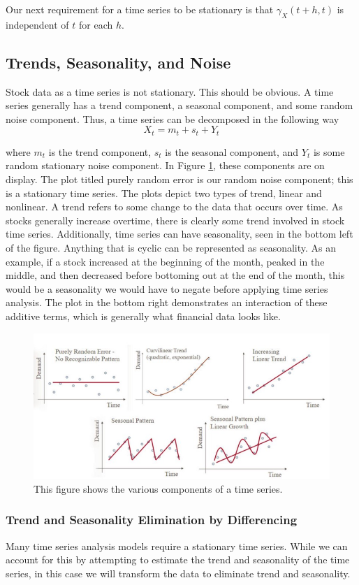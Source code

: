 \documentclass[12pt]{article}
\begin{document}
Our next requirement for a time series to be stationary is that $\gamma_X(t+h, t)$ is independent of $t$ for each $h$. 

\subsection{Trends, Seasonality, and Noise}
Stock data as a time series is not stationary. This should be obvious. A time series generally has a trend component, a seasonal component, and some random noise component. Thus, a time series can be decomposed in the following way
$$X_t = m_t + s_t + Y_t$$

where $m_t$ is the trend component, $s_t$ is the seasonal component, and $Y_t$ is some random stationary noise component. In Figure \ref{trends}, these components are on display. The plot titled purely random error is our random noise component; this is a stationary time series. The plots depict two types of trend, linear and nonlinear. A trend refers to some change to the data that occurs over time. As stocks generally increase overtime, there is clearly some trend involved in stock time series. Additionally, time series can have seasonality, seen in the bottom left of the figure. Anything that is cyclic can be represented as seasonality. As an example, if a stock increased at the beginning of the month, peaked in the middle, and then decreased before bottoming out at the end of the month, this would be a seasonality we would have to negate before applying time series analysis. The plot in the bottom right demonstrates an interaction of these additive terms, which is generally what financial data looks like. \cite[22]{timeseries}

\begin{figure}[ht]
	\centering
	\includegraphics[width=.75\textwidth]{trend.jpeg}
	\caption{This figure shows the various components of a time series. \cite{trend}}
	\label{trends}
\end{figure}

\subsubsection{Trend and Seasonality Elimination by Differencing}
Many time series analysis models require a stationary time series. While we can account for this by attempting to estimate the trend and seasonality of the time series, in this case we will transform the data to eliminate trend and seasonality.
\end{document}
